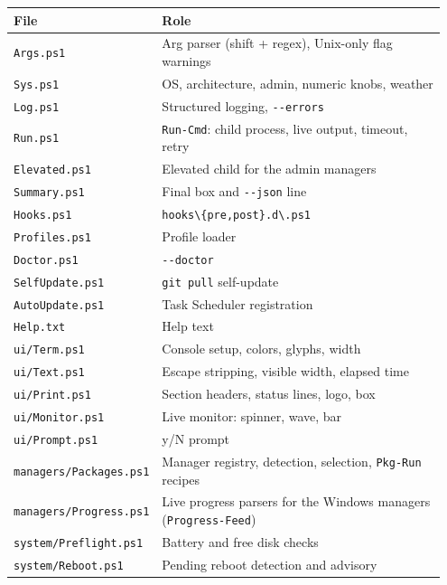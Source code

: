 \documentclass[11pt,a4paper]{article}
\begin{document}
\begin{center}
\begin{tabular}{@{}p{0.25\linewidth} p{0.70\linewidth}@{}}
\toprule
\textbf{File} & \textbf{Role} \\
\midrule
\texttt{Args.ps1}              & Arg parser (shift + regex), Unix-only flag warnings \\
\texttt{Sys.ps1}               & OS, architecture, admin, numeric knobs, weather \\
\texttt{Log.ps1}               & Structured logging, \texttt{-{}-errors} \\
\texttt{Run.ps1}               & \texttt{Run-Cmd}: child process, live output, timeout, retry \\
\texttt{Elevated.ps1}          & Elevated child for the admin managers \\
\texttt{Summary.ps1}           & Final box and \texttt{-{}-json} line \\
\texttt{Hooks.ps1}             & \texttt{hooks\textbackslash \{pre,post\}.d\textbackslash *.ps1} \\
\texttt{Profiles.ps1}          & Profile loader \\
\texttt{Doctor.ps1}            & \texttt{-{}-doctor} \\
\texttt{SelfUpdate.ps1}        & \texttt{git pull} self-update \\
\texttt{AutoUpdate.ps1}        & Task Scheduler registration \\
\texttt{Help.txt}              & Help text \\
\texttt{ui/Term.ps1}           & Console setup, colors, glyphs, width \\
\texttt{ui/Text.ps1}           & Escape stripping, visible width, elapsed time \\
\texttt{ui/Print.ps1}          & Section headers, status lines, logo, box \\
\texttt{ui/Monitor.ps1}        & Live monitor: spinner, wave, bar \\
\texttt{ui/Prompt.ps1}         & y/N prompt \\
\texttt{managers/Packages.ps1} & Manager registry, detection, selection, \texttt{Pkg-Run} recipes \\
\texttt{managers/Progress.ps1} & Live progress parsers for the Windows managers (\texttt{Progress-Feed}) \\
\texttt{system/Preflight.ps1}  & Battery and free disk checks \\
\texttt{system/Reboot.ps1}     & Pending reboot detection and advisory \\

\end{tabular}
\end{center}
\end{document}

